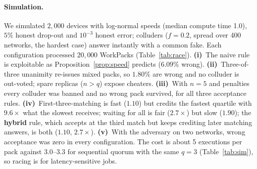 \documentclass[11pt,a4paper]{article}
\theoremstyle{definition}
\theoremstyle{plain}
\begin{document}
\begin{table}[ht]
\centering
\caption{The same request on two machines (Linux + RTX 4090 vs Windows + Tesla T4): how alike the pictures are.
Differences on the 0--255 scale; SSIM on grey levels, 7$\times$7 window; from \texttt{scripts/compare\_pictures.py}.}\label{tab:xplat}
\end{table}

\paragraph{Simulation.} We simulated $2{,}000$ devices with log-normal speeds (median compute time 1.0), $5\%$
honest drop-out and $10^{-3}$ honest error; colluders ($f=0.2$, spread over 400 networks, the hardest case)
answer instantly with a common fake. Each configuration processed $20{,}000$ WorkPacks
(Table~\ref{tab:race}). \textbf{(i)}~The naive rule is exploitable as Proposition~\ref{prop:speed} predicts
($6.09\%$ wrong). \textbf{(ii)}~Three-of-three unanimity re-issues mixed packs, so $1.80\%$ are wrong and no colluder is
out-voted; spare replicas ($n>q$) expose cheaters. \textbf{(iii)}~With $n=5$ and
penalties every colluder was banned and no wrong pack survived, for all three acceptance rules.
\textbf{(iv)}~First-three-matching is fast ($1.10$) but credits the fastest quartile with $9.6\times$ what the
slowest receives; waiting for all is fair ($2.7\times$) but slow ($1.90$); the \textbf{hybrid} rule, which
accepts at the third match but keeps crediting later matching answers, is both ($1.10$, $2.7\times$).
\textbf{(v)}~With the adversary on two networks, wrong acceptance was zero in every configuration. The cost is
about 5 executions per pack against $3.0$--$3.3$ for sequential quorum with the same $q=3$ (Table~\ref{tab:sim}), so racing is for latency-sensitive jobs.
\end{document}
